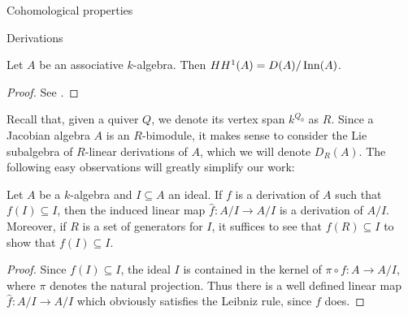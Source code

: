\begin{chapter}{Cohomological properties}
\begin{section}{Derivations}
\begin{lemma} Let $A$ be an associative $k$-algebra. Then $HH^1(A) = D(A)/\operatorname{Inn}(A)$.
\end{lemma}
\begin{proof} See \cite{Red01}.
\end{proof}

Recall that, given a quiver $Q$, we denote its vertex span $k^{Q_0}$ as $R$. Since a Jacobian algebra $A$ is an $R$-bimodule, it makes sense to consider the Lie subalgebra of $R$-linear derivations of $A$, which we will denote $D_R(A)$. The following easy observations will greatly simplify our work:
\begin{obs}\label{derivation-quotient} Let $A$ be a $k$-algebra and $I\subseteq A$ an ideal. If $f$ is a derivation of $A$ such that $f(I)\subseteq I$, then the induced linear map $\hat{f}:A/I\to A/I$ is a derivation of $A/I$. Moreover, if $R$ is a set of generators for $I$, it suffices to see that $f(R)\subseteq I$ to show that $f(I)\subseteq I$.
\end{obs}
\begin{proof} Since $f(I)\subseteq I$, the ideal $I$ is contained in the kernel of $\pi\circ f:A\to A/I$, where $\pi$ denotes the natural projection. Thus there is a well defined linear map $\hat{f}:A/I\to A/I$ which obviously satisfies the Leibniz rule, since $f$ does.


\end{proof}
\end{section}
\end{chapter}
